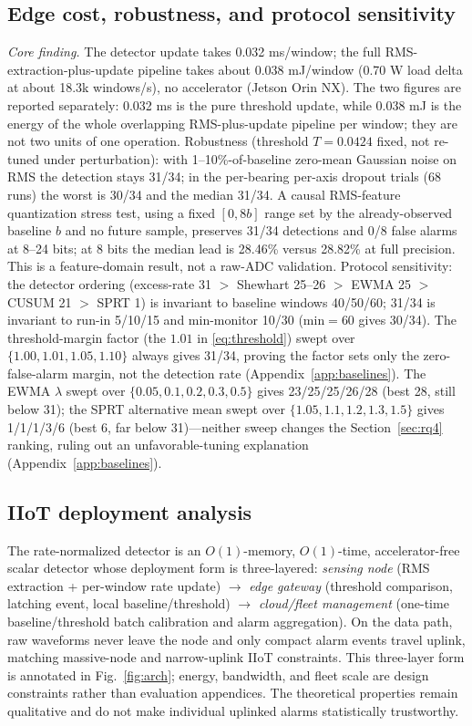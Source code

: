 \documentclass[journal]{IEEEtran}
\begin{document}
\subsection{Edge cost, robustness, and protocol sensitivity}\label{sec:robustness}
\emph{Core finding.} The detector update takes 0.032 ms/window; the full RMS-extraction-plus-update pipeline takes about 0.038 mJ/window (0.70 W load delta at about 18.3k windows/s), no accelerator (Jetson Orin NX). The two figures are reported separately: 0.032 ms is the pure threshold update, while 0.038 mJ is the energy of the whole overlapping RMS-plus-update pipeline per window; they are not two units of one operation. Robustness (threshold $T=0.0424$ fixed, not re-tuned under perturbation): with 1--10\%-of-baseline zero-mean Gaussian noise on RMS the detection stays 31/34; in the per-bearing per-axis dropout trials (68 runs) the worst is 30/34 and the median 31/34. A causal RMS-feature quantization stress test, using a fixed $[0,8b]$ range set by the already-observed baseline $b$ and no future sample, preserves 31/34 detections and 0/8 false alarms at 8--24 bits; at 8 bits the median lead is 28.46\% versus 28.82\% at full precision. This is a feature-domain result, not a raw-ADC validation. Protocol sensitivity: the detector ordering (excess-rate 31 $>$ Shewhart 25--26 $>$ EWMA 25 $>$ CUSUM 21 $>$ SPRT 1) is invariant to baseline windows 40/50/60; 31/34 is invariant to run-in 5/10/15 and min-monitor 10/30 (min$=$60 gives 30/34). The threshold-margin factor (the $1.01$ in \eqref{eq:threshold}) swept over $\{1.00,1.01,1.05,1.10\}$ always gives 31/34, proving the factor sets only the zero-false-alarm margin, not the detection rate (Appendix~\ref{app:baselines}). The EWMA $\lambda$ swept over $\{0.05,0.1,0.2,0.3,0.5\}$ gives 23/25/25/26/28 (best 28, still below 31); the SPRT alternative mean swept over $\{1.05,1.1,1.2,1.3,1.5\}$ gives 1/1/1/3/6 (best 6, far below 31)---neither sweep changes the Section~\ref{sec:rq4} ranking, ruling out an unfavorable-tuning explanation (Appendix~\ref{app:baselines}).

\subsection{IIoT deployment analysis}\label{sec:deploy}
The rate-normalized detector is an $O(1)$-memory, $O(1)$-time, accelerator-free scalar detector whose deployment form is three-layered: \emph{sensing node} (RMS extraction + per-window rate update) $\to$ \emph{edge gateway} (threshold comparison, latching event, local baseline/threshold) $\to$ \emph{cloud/fleet management} (one-time baseline/threshold batch calibration and alarm aggregation). On the data path, raw waveforms never leave the node and only compact alarm events travel uplink, matching massive-node and narrow-uplink IIoT constraints. This three-layer form is annotated in Fig.~\ref{fig:arch}; energy, bandwidth, and fleet scale are design constraints rather than evaluation appendices. The theoretical properties remain qualitative and do not make individual uplinked alarms statistically trustworthy.
\end{document}
